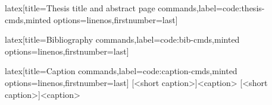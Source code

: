 \begin{code}{latex}[title={Thesis title and abstract page commands},label=code:thesis-cmds,minted options={linenos,firstnumber=last}]
\maketitle[thesis]
\end{code}
%
\begin{code}{latex}[title={Bibliography commands},label=code:bib-cmds,minted options={linenos,firstnumber=last}]
\makebibliography[<options>]
\end{code}
%
\begin{code}{latex}[title={Caption commands},label=code:caption-cmds,minted options={linenos,firstnumber=last}]
[<short caption>]{<caption>}
[<short caption>]{<caption>}
\end{code}
%
